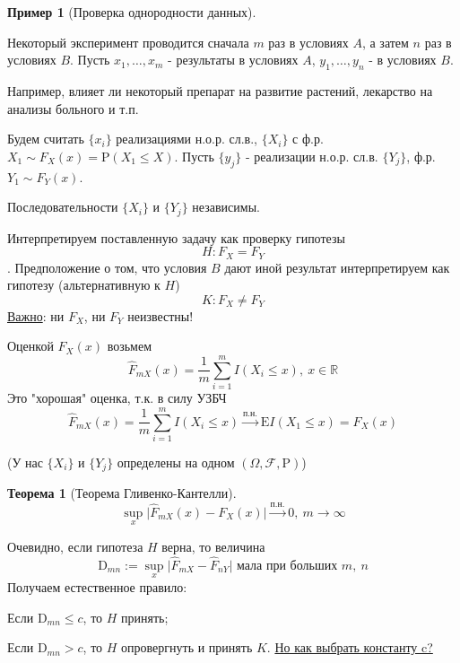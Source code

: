 \documentclass[12pt]{article}
\newtheorem*{example}{Пример}
\theoremstyle{basic_theorem}
\theoremstyle{name_theorem}
\newtheorem*{named_theorem}{Теорема}
\def\R{
    \mathbb{R}
}
\def\E{
    \mathrm{E}
}
\def\D{
    \mathrm{D}
}
\def\P{
    \mathrm{P}
}
\def\F{
    \mathcal{F}
}
\begin{document}
    \begin{example}[Проверка однородности данных]
    \end{example}
    Некоторый эксперимент проводится сначала $m$ раз в
    условиях $A$, а затем $n$ раз в условиях $B$.
    Пусть $x_1,\ldots,x_m$ -  результаты в условиях $A$,
    $y_1,\ldots,y_n$ - в условиях $B$.

    Например, влияет ли некоторый препарат на развитие растений,
    лекарство на анализы больного и т.п.

    Будем считать $\{x_i\}$ реализациями н.о.р. сл.в.,
    $\{X_i\}$ с ф.р. $X_1\sim F_X(x)=\P(X_1\leq X)$.
    Пусть $\{y_j\}$ - реализации н.о.р. сл.в. $\{Y_j\}$,
    ф.р. $Y_1\sim F_Y(x)$.

    Последовательности $\{X_i\}$ и $\{Y_j\}$ независимы.

    Интерпретируем поставленную задачу как проверку гипотезы
    $$H: F_X = F_Y$$. Предположение о том, что условия $B$
    дают иной результат интерпретируем как гипотезу (альтернативную к $H$)
    $$K: F_X \neq F_Y$$
    \underline{Важно}: ни $F_X$, ни $F_Y$ неизвестны!
    
    Оценкой $F_X(x)$ возьмем
    $$\hat{F}_{mX}(x)=\frac{1}{m}\sum^m_{i=1}I(X_i\leq x),\ x\in\R$$
    Это "хорошая" оценка, т.к. в силу УЗБЧ
    $$\hat{F}_{mX}(x)=\frac{1}{m}\sum^m_{i=1}I(X_i\leq x)\xrightarrow{\text{п.н.}}\E I(X_1\leq x) = F_X(x)$$

    (У нас $\{X_i\}$ и $\{Y_j\}$ определены на одном $(\Omega,\F,\P)$)
    \begin{named_theorem}[Теорема Гливенко-Кантелли]
        $$\sup_x \vert\hat{F}_{mX}(x) - F_X(x)\vert\xrightarrow{\text{п.н.}}0,\ m\rightarrow\infty$$
    \end{named_theorem}

    Очевидно, если гипотеза $H$ верна, то величина
    $$\D_{mn} :=\sup_x\vert\hat{F}_{mX}-\hat{F}_{nY}\vert\text{ мала при больших }m,\ n$$
    Получаем естественное правило: \par
        Если $\D_{mn}\leq c$, то $H$ принять; \par
        Если $\D_{mn}>c$, то $H$ опровергнуть и принять $K$. \newline
    \underline{Но как выбрать константу c?}
\end{document}
